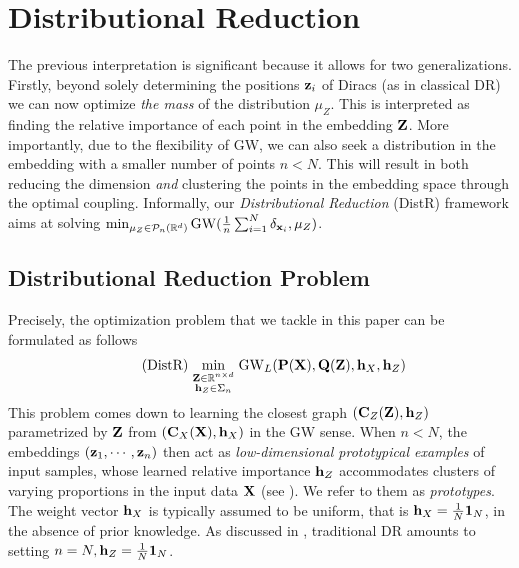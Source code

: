 

\section{Distributional Reduction}\label{sec:DDR}


The previous interpretation is significant because it allows for two generalizations. Firstly, beyond solely determining the positions ${\mathbf{z}}_i$ of Diracs (as in classical DR) we can now optimize \emph{the mass} of the distribution $\mu_Z$. This is interpreted as finding the relative importance of each point in the embedding ${\mathbf{Z}}$. More importantly, due to the flexibility of GW, we can also seek a distribution in the embedding with a smaller number of points $n < N$. This will result in both reducing the dimension \emph{and} clustering the points in the embedding space through the optimal coupling. Informally, our \emph{Distributional Reduction} (DistR) framework aims at solving $\min_{\mu_Z \in {\mathcal{P}}_n(\mathbb{R}^d)} \operatorname{GW}(\frac{1}{n} \sum_{i=1}^{N} \delta_{{\mathbf{x}}_i}, \mu_Z)$.


\subsection{Distributional Reduction Problem}\label{sec:DDR_ob}

Precisely, the optimization problem that we tackle in this paper can be formulated as follows
\begin{align}\tag{DistR}\label{eq:Dist-DR}
	\min_{\begin{smallmatrix} {\mathbf{Z}} \in \mathbb{R}^{n \times d} \\ {\mathbf{h}}_Z \in \Sigma_n \end{smallmatrix}} \operatorname{GW}_L ({\mathbf{P}}({\mathbf{X}}), {\mathbf{Q}}({\mathbf{Z}}), {\mathbf{h}}_X, {\mathbf{h}}_Z)
\end{align}
This problem comes down to learning the closest graph $({\mathbf{C}}_Z({\mathbf{Z}}), {\mathbf{h}}_Z)$ parametrized by ${\mathbf{Z}}$ from $({\mathbf{C}}_X({\mathbf{X}}), {\mathbf{h}}_X)$ in the GW sense. When $n < N$, the embeddings $({\mathbf{z}}_1, \cdots, {\mathbf{z}}_n)$ then act as \emph{low-dimensional prototypical examples} of input samples, whose learned relative importance ${\mathbf{h}}_Z$ accommodates clusters of varying proportions in the input data ${\mathbf{X}}$ (see ). We refer to them as \emph{prototypes}. The weight vector ${\mathbf{h}}_X$ is typically assumed to be uniform, that is ${\mathbf{h}}_X=\frac{1}{N} \bm{1}_N$, in the absence of prior knowledge. As discussed in , traditional DR amounts to setting $n = N, {\mathbf{h}}_Z = \frac{1}{N} \bm{1}_N$.

